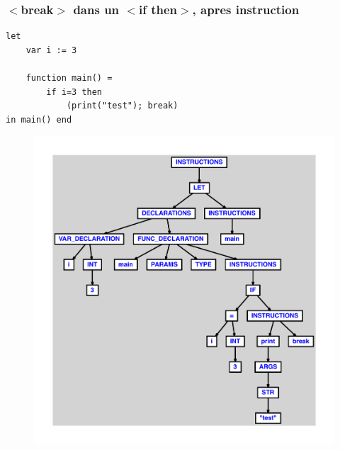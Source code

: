 \documentclass{article}
\begin{document}
\subsubsection{$ < $break$ > $ dans un $ < $if then$ > $, apres instruction}
\begin{lstlisting}
let
	var i := 3

	function main() =
		if i=3 then
			(print("test"); break)
in main() end
\end{lstlisting}
\newpage
\begin{figure}[H]
\centering
\includegraphics[max width=\textwidth]{ast/ast_16.pdf}
\end{figure}
\newpage
\end{document}
